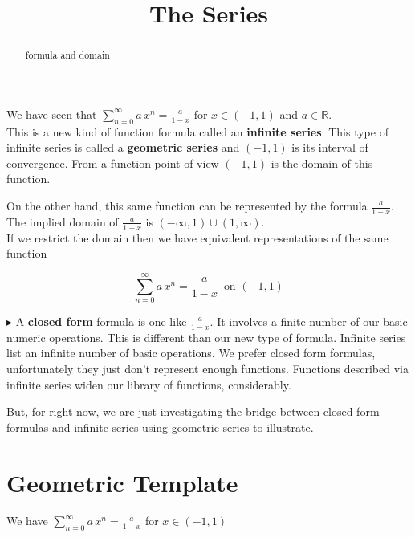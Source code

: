 \documentclass{ximera}
\title{The Series}
\begin{document}
\begin{abstract}
formula and domain
\end{abstract}
\maketitle




We have seen that $\sum\limits_{n=0}^{\infty} a \, x^n = \frac{a}{1-x}$ for $x \in (-1, 1)$ and $a \in \mathbb{R}$. \\




This is a new kind of function formula called an \textbf{infinite series}.  This type of infinite series is called a \textbf{geometric series} and $(-1, 1)$ is its interval of convergence.  From a function point-of-view $(-1, 1)$  is the domain of this function.


On the other hand, this same function can be represented by the formula $\frac{a}{1-x}$.  The implied domain of $\frac{a}{1-x}$ is $(-\infty, 1) \cup (1, \infty)$. \\ 


If we restrict the domain then we have equivalent representations of the same function 


\[
\sum\limits_{n=0}^{\infty} a \, x^n   =    \frac{a}{1-x}    \, \text{ on } (-1, 1)
\]



$\blacktriangleright$ A \textbf{closed form} formula is one like  $\frac{a}{1-x}$.  It involves a finite number of our basic numeric operations.  This is different than our new type of formula.  Infinite series list an infinite number of basic operations.  We prefer closed form formulas, unfortunately they just don't represent enough functions. Functions described via infinite series widen our library of functions, considerably.

But, for right now, we are just investigating the bridge between closed form formulas and infinite series using geometric series to illustrate.






\section{Geometric Template}


We have $\sum\limits_{n=0}^{\infty} a \, x^n = \frac{a}{1-x}$ for $x \in (-1, 1)$ \\
\end{document}
